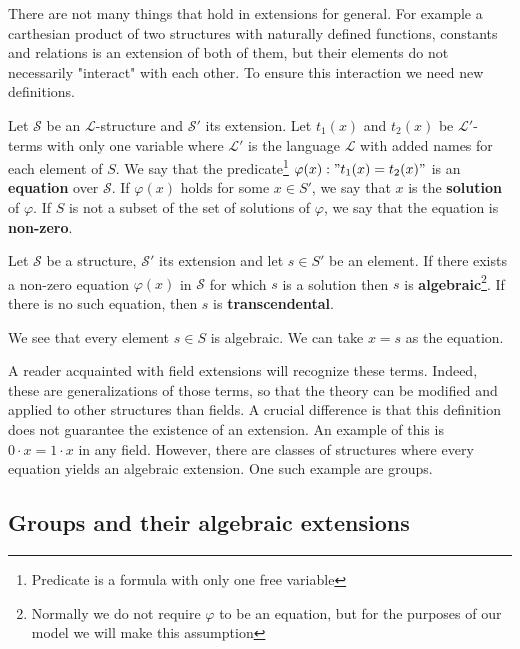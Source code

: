 There are not many things that hold in extensions for general. For example a carthesian product of two structures with naturally defined functions, constants and relations is an extension of both of them, but their elements do not necessarily "interact" with each other. To ensure this interaction we need new definitions.

\begin{defn}
	Let $\mathcal{S}$ be an $\mathcal{L}$-structure and $\mathcal{S}'$ its extension. Let $t_1(x)$ and $t_2(x)$ be $\mathcal{L}'$-terms with only one variable where $\mathcal{L}'$ is the language $\mathcal{L}$ with added names for each element of $S$. We say that the predicate\footnote{Predicate is a formula with only one free variable} $\varphi(x): "t_1(x)=t_2(x)"$ is an \textbf{equation} over $\mathcal{S}$. If $\varphi(x)$ holds for some $x\in S'$, we say that $x$ is the \textbf{solution} of $\varphi$. If $S$ is not a subset of the set of solutions of $\varphi$, we say that the equation is \textbf{non-zero}.
\end{defn}
\begin{defn}	
	Let $\mathcal{S}$ be a structure, $\mathcal{S}'$ its extension and let $s\in S'$ be an element. If there exists a non-zero equation $\varphi(x)$ in $\mathcal{S}$ for which $s$ is a solution then $s$ is \textbf{algebraic}\footnote{Normally we do not require $\varphi$ to be an equation, but for the purposes of our model we will make this assumption}. If there is no such equation, then $s$ is \textbf{transcendental}.
\end{defn}

We see that every element $s\in S$ is algebraic. We can take $x=s$ as the equation.

A reader acquainted with field extensions will recognize these terms. Indeed, these are generalizations of those terms, so that the theory can be modified and applied to other structures than fields. A crucial difference is that this definition does not guarantee the existence of an extension. An example of this is $0\cdot x=1\cdot x$ in any field. However, there are classes of structures where every equation yields an algebraic extension. One such example are groups.

\subsection{Groups and their algebraic extensions}
\label{section:groups}

